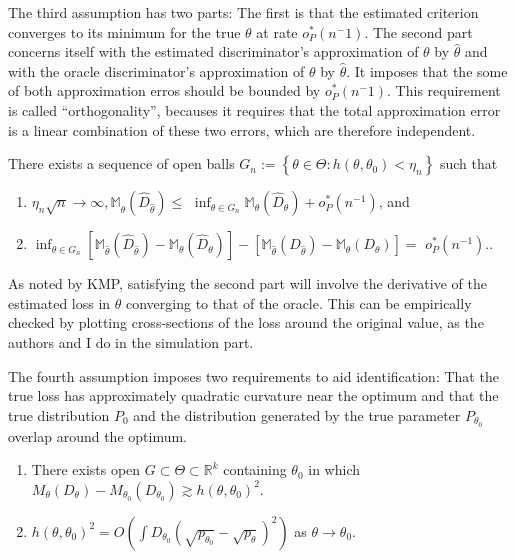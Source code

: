The third assumption has two parts: 
The first is that the estimated criterion converges to its minimum for the true $\theta$ at rate $o^{*}_P(n^-1)$. %
The second part concerns itself with the estimated discriminator's approximation of $\theta$ by $\hat{\theta}$
and with the oracle discriminator's approximation of $\theta$ by $\hat{\theta}$.
It imposes that the some of both approximation erros should be bounded by $o^{*}_P(n^-1)$.
This requirement is called ``orthogonality'', becauses it requires that the total approximation error is a linear combination of these two errors, which are therefore independent.

\begin{assumption}[A3, KMP]
    \label{a:3}
    There exists a sequence of open balls $G_{n}:=\left\{\theta \in \Theta: h\left(\theta, \theta_{0}\right)<\eta_{n}\right\}$ such that
    \begin{enumerate}
        \item $\eta_{n} \sqrt{n} \rightarrow \infty, \mathbb{M}_{\hat{\theta}}\left(\hat{D}_{\hat{\theta}}\right) \leq$ $\inf _{\theta \in G_{n}} \mathbb{M}_{\theta}\left(\hat{D}_{\theta}\right)+o_{P}^{*}\left(n^{-1}\right)$, and
        \item $\inf _{\theta \in G_{n}}\left[\mathbb{M}_{\hat{\theta}}\left(\hat{D}_{\hat{\theta}}\right)-\mathbb{M}_{\theta}\left(\hat{D}_{\theta}\right)\right]-\left[\mathbb{M}_{\hat{\theta}}\left(D_{\hat{\theta}}\right)-\mathbb{M}_{\theta}\left(D_{\theta}\right)\right]=$ $o_{P}^{*}\left(n^{-1}\right)$..
    \end{enumerate}
\end{assumption}

As noted by KMP, satisfying the second part will involve the derivative of the estimated loss in $\theta$ converging to that of the oracle. %
This can be empirically checked by plotting cross-sections of the loss around the original value, as the authors and I do in the simulation part.

The fourth assumption imposes two requirements to aid identification:
That the true loss has approximately quadratic curvature near the optimum and that the true distribution $P_{0}$ and the distribution generated by the true parameter $P_{\theta_0}$ overlap around the optimum.

\begin{assumption}[A4, KMP]
    \label{a:4}
    \begin{enumerate}
        \item There exists open $G \subset \Theta \subset \mathbb{R}^{k}$ containing $\theta_{0}$ in which $M_{\theta}\left(D_{\theta}\right)-M_{\theta_{0}}\left(D_{\theta_{0}}\right) \gtrsim h\left(\theta, \theta_{0}\right)^{2}$. 
        \item $h\left(\theta, \theta_{0}\right)^{2}=O\left(\int D_{\theta_{0}}\left(\sqrt{p_{\theta_{0}}}-\sqrt{p_{\theta}}\right)^{2}\right)$ as $\theta \rightarrow \theta_{0}$.
    \end{enumerate}
\end{assumption}

